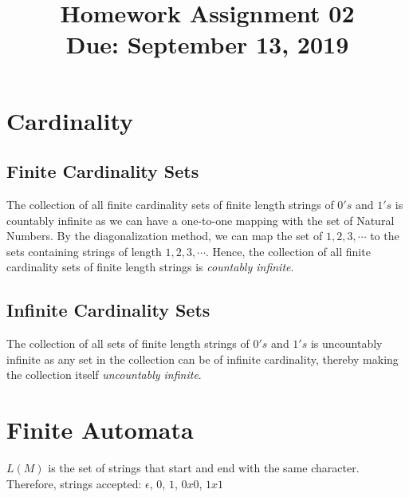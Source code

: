 \documentclass[11pt,letterpaper]{article}
\title{Homework Assignment 02 \\
    \small Due: September 13, 2019}
\begin{document}
\maketitle

\section{Cardinality}
\subsection{Finite Cardinality Sets}
The collection of all finite cardinality sets of finite length strings of $0's$ and $1's$ is countably infinite as we can have a one-to-one mapping with the set of Natural Numbers. By the diagonalization method, we can map the set of  $1,2,3,\cdots$ to the sets containing strings of length $1,2,3,\cdots$. Hence, the collection of all finite cardinality sets of finite length strings is \textit{countably infinite}.

\subsection{Infinite Cardinality Sets}
The collection of all sets of finite
length strings of $0's$ and $1's$ is uncountably infinite as any set in the collection can be of infinite cardinality, thereby making the collection itself \textit{uncountably infinite}.

\section{Finite Automata}
\label{sec:s2}
$L(M)$ is the set of strings that start and end with the same character. Therefore, strings accepted: $\epsilon$, $0$, $1$, $0x0$, $1x1$
\end{document}
